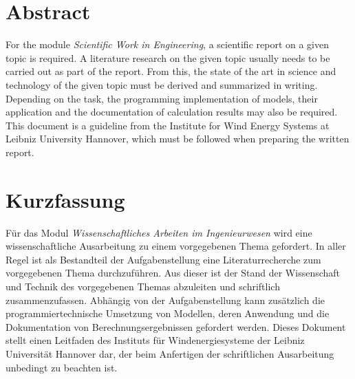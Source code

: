 \vspace*{0mm}
\section*{Abstract}

For the module \textit{Scientific Work in Engineering}, a scientific report on a given topic is required. A literature research on the given topic usually needs to be carried out as part of the report. From this, the state of the art in science and technology of the given topic must be derived and summarized in writing. Depending on the task, the programming implementation of models, their application and the documentation of calculation results may also be required. This document is a guideline from the Institute for Wind Energy Systems at Leibniz University Hannover, which must be followed when preparing the written report. \\

\vspace*{9mm}
\section*{Kurzfassung}

Für das Modul \textit{Wissenschaftliches Arbeiten im Ingenieurwesen} wird eine wissenschaftliche Ausarbeitung zu einem vorgegebenen Thema gefordert. In aller Regel ist als Bestandteil der Aufgabenstellung eine Literaturrecherche zum vorgegebenen Thema durchzuführen. Aus dieser ist der Stand der Wissenschaft und Technik des vorgegebenen Themas abzuleiten und schriftlich zusammenzufassen. Abhängig von der Aufgabenstellung kann zusätzlich die programmiertechnische Umsetzung von Modellen, deren Anwendung und die Dokumentation von Berechnungsergebnissen gefordert werden. Dieses Dokument stellt einen Leitfaden des Instituts für Windenergiesysteme der Leibniz Universität Hannover dar, der beim Anfertigen der schriftlichen Ausarbeitung unbedingt zu beachten ist. \\

\clearpage
